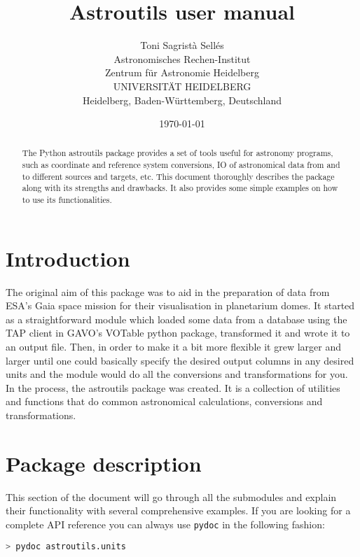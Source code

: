 \documentclass[
a4paper, %
11pt, %
onecolumn, %
openany, %
]{memoir}
\title{Astroutils user manual}
\author{
        Toni Sagrist\`a Sell\'es \\
        Astronomisches Rechen-Institut\\
	Zentrum f\"ur Astronomie Heidelberg \\
	UNIVERSIT\"AT HEIDELBERG \\
        Heidelberg, Baden-W\"urttemberg, Deutschland
}
\date{\today}
\begin{document}
\maketitle
\small

\begin{abstract}
The Python astroutils package provides a set of tools useful for astronomy
programs, such as coordinate and reference system conversions, IO of astronomical
data from and to different sources and targets, etc. This document thoroughly describes the package
along with its strengths and drawbacks.  It also provides some simple examples on how to use
its functionalities.
\end{abstract}

\section{Introduction}
The original aim of this package was to aid in the preparation of data from ESA's Gaia
space mission for their visualisation in planetarium domes. It started as a straightforward module
which loaded some data from a database using the TAP client in GAVO's VOTable python 
package, transformed it and wrote it to an output file. Then, in order to make it a bit more flexible
it grew larger and larger until one could basically specify the desired output columns
in any desired units and the module would do all the conversions and transformations
for you. In the process, the astroutils package was created. It is a collection of utilities and functions
that do common astronomical calculations, conversions and transformations. 


\section{Package description}\label{package description}
This section of the document will go through all the submodules and explain their functionality with
several comprehensive examples. If you are looking for a complete API reference you can always use \texttt{pydoc} in
the following fashion:

\begin{lstlisting}[language=Python]
> pydoc astroutils.units
\end{lstlisting}
\end{document}

